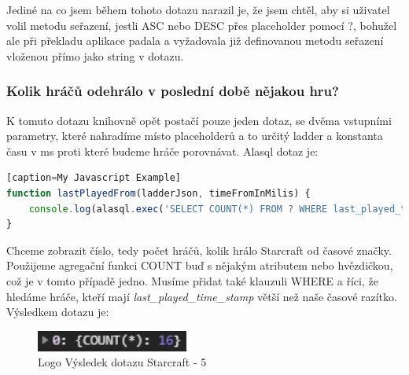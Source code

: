 \documentclass[a4, titlepage]{article}
\begin{document}
Jediné na co jsem během tohoto dotazu narazil je, že jsem chtěl, aby si uživatel volil metodu seřazení, jestli ASC nebo DESC přes placeholder pomocí ?, bohužel ale při překladu aplikace padala a vyžadovala již definovanou metodu seřazení vloženou přímo jako string v dotazu.

\subsubsection{Kolik hráčů odehrálo v poslední době nějakou hru?}
K tomuto dotazu knihovně opět postačí pouze jeden dotaz, se dvěma vstupními parametry, které nahradíme místo placeholderů a to určitý ladder a konstanta času v ms proti které budeme hráče porovnávat. Alasql dotaz je:
\begin{lstlisting}[language=JavaScript][caption=My Javascript Example]
function lastPlayedFrom(ladderJson, timeFromInMilis) {
    console.log(alasql.exec('SELECT COUNT(*) FROM ? WHERE last_played_time_stamp > ?', [ladderJson.team, timeFromInMilis]));
}
\end{lstlisting}
Chceme zobrazit číslo, tedy počet hráčů, kolik hrálo Starcraft od časové značky. Použijeme agregační funkci COUNT buď s nějakým atributem nebo hvězdičkou, což je v tomto případě jedno. Musíme přidat také klauzuli WHERE a říci, že hledáme hráče, kteří mají \textit{last\_played\_time\_stamp} větší než naše časové razítko. Výsledkem dotazu je:

\begin{figure}[h]
    \centering
    \includegraphics[width=5cm]{S5}
    \caption{Logo Výsledek dotazu Starcraft - 5}
\end{figure} 
\end{document}
